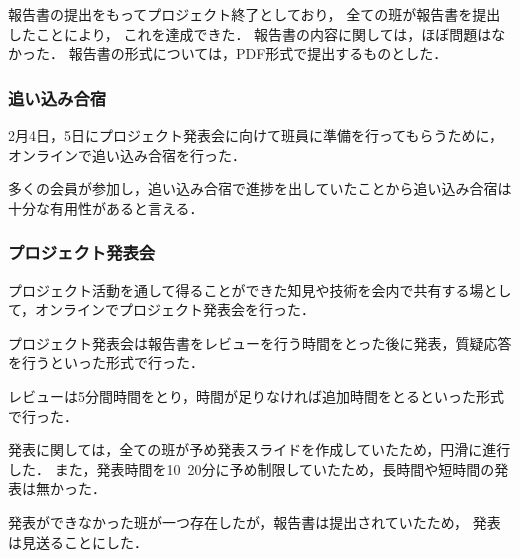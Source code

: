 報告書の提出をもってプロジェクト終了としており，
全ての班が報告書を提出したことにより，
これを達成できた．
報告書の内容に関しては，ほぼ問題はなかった．
報告書の形式については，PDF形式で提出するものとした．

\subsubsection*{追い込み合宿}
2月4日，5日にプロジェクト発表会に向けて班員に準備を行ってもらうために，オンラインで追い込み合宿を行った．

多くの会員が参加し，追い込み合宿で進捗を出していたことから追い込み合宿は十分な有用性があると言える．

\subsubsection*{プロジェクト発表会}

プロジェクト活動を通して得ることができた知見や技術を会内で共有する場として，オンラインでプロジェクト発表会を行った．

プロジェクト発表会は報告書をレビューを行う時間をとった後に発表，質疑応答を行うといった形式で行った．

レビューは5分間時間をとり，時間が足りなければ追加時間をとるといった形式で行った．

発表に関しては，全ての班が予め発表スライドを作成していたため，円滑に進行した．
また，発表時間を10~20分に予め制限していたため，長時間や短時間の発表は無かった．

発表ができなかった班が一つ存在したが，報告書は提出されていたため，
発表は見送ることにした．
